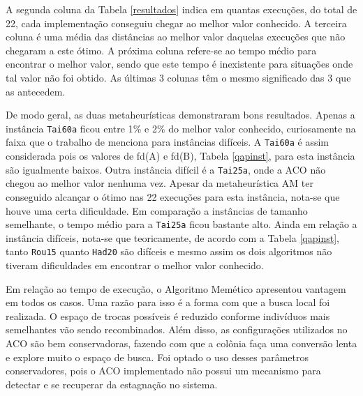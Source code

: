 A segunda coluna da Tabela \ref{resultados} indica em quantas
execuções, do total de 22, cada implementação conseguiu chegar ao
melhor valor conhecido. A terceira coluna é uma média das distâncias
ao melhor valor daquelas execuções que não chegaram a este ótimo. A
próxima coluna refere-se ao tempo médio para encontrar o melhor valor,
sendo que este tempo é inexistente para situações onde tal valor não
foi obtido. As últimas 3 colunas têm o mesmo significado das 3 que as
antecedem.

De modo geral, as duas metaheurísticas demonstraram bons
resultados. Apenas a instância \verb!Tai60a! ficou entre 1\% e 2\% do
melhor valor conhecido, curiosamente na faixa que o trabalho de
\cite{taillard1} menciona para instâncias difíceis. A \verb!Tai60a! é
assim considerada pois os valores de fd(A) e fd(B), Tabela
\ref{qapinst}, para esta instância são igualmente baixos.
Outra instância difícil é a \verb!Tai25a!, onde a ACO não chegou ao
melhor valor nenhuma vez. Apesar da metaheurística AM ter conseguido
alcançar o ótimo nas 22 execuções para esta instância, nota-se que
houve uma certa dificuldade. Em comparação a instâncias de tamanho
semelhante, o tempo médio para a \verb!Tai25a! ficou bastante alto.
Ainda em relação a instância difíceis, nota-se que teoricamente, de
acordo com a Tabela \ref{qapinst}, tanto \verb!Rou15! quanto
\verb!Had20! são difíceis e mesmo assim os dois algoritmos não tiveram
dificuldades em encontrar o melhor valor conhecido.

Em relação ao tempo de execução, o Algoritmo Memético apresentou
vantagem em todos os casos. Uma razão para isso é a forma com que a
busca local foi realizada. O espaço de trocas possíveis é reduzido
conforme indivíduos mais semelhantes vão sendo recombinados. Além disso, as
configurações utilizados no ACO são bem conservadoras, fazendo com que a
colônia faça uma conversão lenta e explore muito o espaço de busca. Foi
optado o uso desses parâmetros conservadores, pois o ACO implementado não
possui um mecanismo para detectar e se recuperar da estagnação no sistema. 

